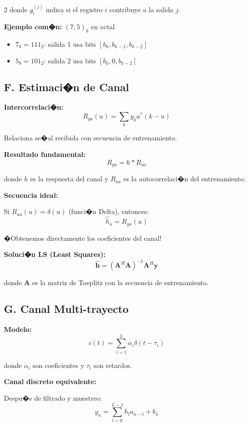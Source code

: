 ﻿\documentclass[8pt,a4paper]{article}
\begin{document}
\begin{multicols}{2}
donde $g_i^{(j)}$ indica si el registro $i$ contribuye a la salida $j$.

\textbf{Ejemplo com�n:} $(7, 5)_8$ en octal
\begin{itemize}[leftmargin=*,itemsep=1pt]
    \item $7_8 = 111_2$: salida 1 usa bits $[b_k, b_{k-1}, b_{k-2}]$
    \item $5_8 = 101_2$: salida 2 usa bits $[b_k, 0, b_{k-2}]$
\end{itemize}

\vspace{-2mm}
\subsection*{\small F. Estimaci�n de Canal}
\vspace{-2mm}

\textbf{Intercorrelaci�n:}
\[
R_{ya}(u) = \sum_k y_k a^*(k-u)
\]

Relaciona se�al recibida con secuencia de entrenamiento.

\textbf{Resultado fundamental:}
\[
\boxed{R_{ya} = h * R_{aa}}
\]

donde $h$ es la respuesta del canal y $R_{aa}$ es la autocorrelaci�n del entrenamiento.

\textbf{Secuencia ideal:}

Si $R_{aa}(u) = \delta(u)$ (funci�n Delta), entonces:
\[
\boxed{\hat{h}_u = R_{ya}(u)}
\]

�Obtenemos directamente los coeficientes del canal!

\textbf{Soluci�n LS (Least Squares):}
\[
\hat{\mathbf{h}} = (\mathbf{A}^H \mathbf{A})^{-1} \mathbf{A}^H \mathbf{y}
\]

donde $\mathbf{A}$ es la matriz de Toeplitz con la secuencia de entrenamiento.

\vspace{-2mm}
\subsection*{\small G. Canal Multi-trayecto}
\vspace{-2mm}

\textbf{Modelo:}
\[
c(t) = \sum_{i=1}^{L} \alpha_i \delta(t - \tau_i)
\]

donde $\alpha_i$ son coeficientes y $\tau_i$ son retardos.

\textbf{Canal discreto equivalente:}

Despu�s de filtrado y muestreo:
\[
y_n = \sum_{l=0}^{L-1} h_l a_{n-l} + b_n
\]


\end{multicols}
\end{document}
